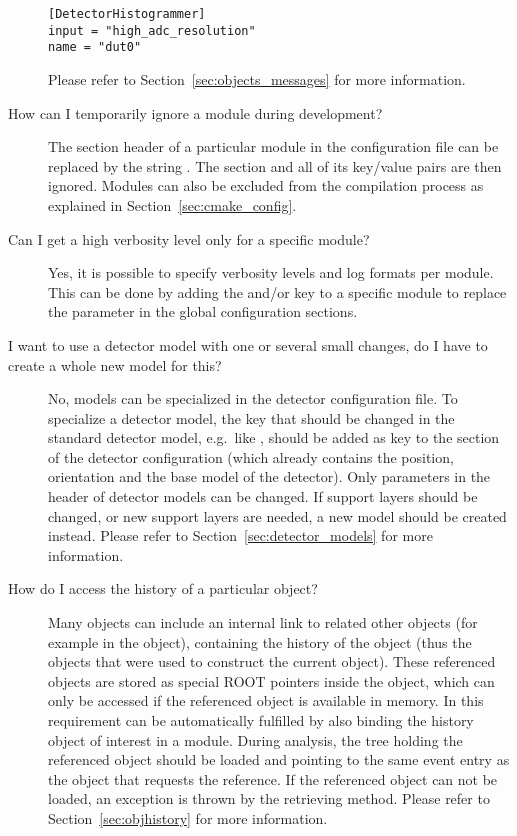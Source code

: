 \begin{description}
\begin{verbatim}
[DetectorHistogrammer]
input = "high_adc_resolution"
name = "dut0"
\end{verbatim}
Please refer to Section~\ref{sec:objects_messages} for more information.
\item[How can I temporarily ignore a module during development?]
The section header of a particular module in the configuration file can be replaced by the string .
The section and all of its key/value pairs are then ignored.
Modules can also be excluded from the compilation process as explained in Section~\ref{sec:cmake_config}.
\item[Can I get a high verbosity level only for a specific module?]
Yes, it is possible to specify verbosity levels and log formats per module.
This can be done by adding the  and/or  key to a specific module to replace the parameter in the global configuration sections.
\item[I want to use a detector model with one or several small changes, do I have to create a whole new model for this?] No, models can be specialized in the detector configuration file.
To specialize a detector model, the key that should be changed in the standard detector model, e.g.\ like , should be added as key to the section of the detector configuration (which already contains the position, orientation and the base model of the detector).
Only parameters in the header of detector models can be changed.
If support layers should be changed, or new support layers are needed, a new model should be created instead.
Please refer to Section~\ref{sec:detector_models} for more information.
\item[How do I access the history of a particular object?]
Many objects can include an internal link to related other objects (for example  in the  object), containing the history of the object (thus the objects that were used to construct the current object).
These referenced objects are stored as special ROOT pointers inside the object, which can only be accessed if the referenced object is available in memory.
In \apsq this requirement can be automatically fulfilled by also binding the history object of interest in a module.
During analysis, the tree holding the referenced object should be loaded and pointing to the same event entry as the object that requests the reference.
If the referenced object can not be loaded, an exception is thrown by the retrieving method.
Please refer to Section~\ref{sec:objhistory} for more information.

\end{description}
